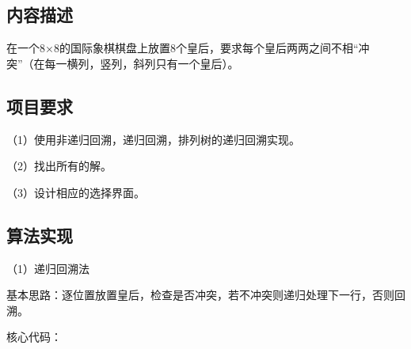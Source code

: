 \documentclass[12pt, a4paper, oneside]{ctexart}
\begin{document}
\subsection{内容描述}
\begin{flushleft}
\songti\fontsize{16pt}{16pt}\selectfont
在一个8×8的国际象棋棋盘上放置8个皇后，要求每个皇后两两之间不相“冲突”（在每一横列，竖列，斜列只有一个皇后）。
\end{flushleft}

\subsection{项目要求}
\begin{flushleft}
\songti\fontsize{16pt}{16pt}\selectfont
（1）使用非递归回溯，递归回溯，排列树的递归回溯实现。

（2）找出所有的解。

（3）设计相应的选择界面。
\end{flushleft}

\subsection{算法实现}
\begin{flushleft}
\songti\fontsize{16pt}{16pt}\selectfont
（1）递归回溯法

基本思路：逐位置放置皇后，检查是否冲突，若不冲突则递归处理下一行，否则回溯。

核心代码：
\end{flushleft}
\end{document}
